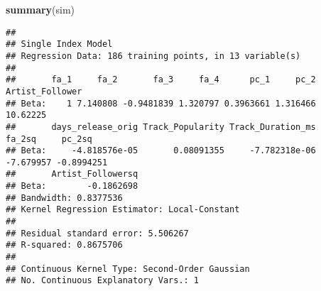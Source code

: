 \documentclass[
]{article}
\newenvironment{Shaded}{\begin{snugshade}}{\end{snugshade}}
\newcommand{\DataTypeTok}[1]{\textcolor[rgb]{0.13,0.29,0.53}{#1}}
\newcommand{\DecValTok}[1]{\textcolor[rgb]{0.00,0.00,0.81}{#1}}
\newcommand{\KeywordTok}[1]{\textcolor[rgb]{0.13,0.29,0.53}{\textbf{#1}}}
\newcommand{\NormalTok}[1]{#1}
\newcommand{\OperatorTok}[1]{\textcolor[rgb]{0.81,0.36,0.00}{\textbf{#1}}}
\newcommand{\StringTok}[1]{\textcolor[rgb]{0.31,0.60,0.02}{#1}}
\begin{document}
\begin{Shaded}
\begin{Highlighting}[]
\KeywordTok{summary}\NormalTok{(sim)}
\end{Highlighting}
\end{Shaded}

\begin{verbatim}
## 
## Single Index Model
## Regression Data: 186 training points, in 13 variable(s)
## 
##       fa_1     fa_2       fa_3     fa_4      pc_1     pc_2 Artist_Follower
## Beta:    1 7.140808 -0.9481839 1.320797 0.3963661 1.316466        10.62225
##       days_release_orig Track_Popularity Track_Duration_ms    fa_2sq     pc_2sq
## Beta:     -4.818576e-05       0.08091355     -7.782318e-06 -7.679957 -0.8994251
##       Artist_Followersq
## Beta:        -0.1862698
## Bandwidth: 0.8377536
## Kernel Regression Estimator: Local-Constant
## 
## Residual standard error: 5.506267
## R-squared: 0.8675706
## 
## Continuous Kernel Type: Second-Order Gaussian
## No. Continuous Explanatory Vars.: 1
\end{verbatim}

\begin{Shaded}
\end{Shaded}
\end{document}
